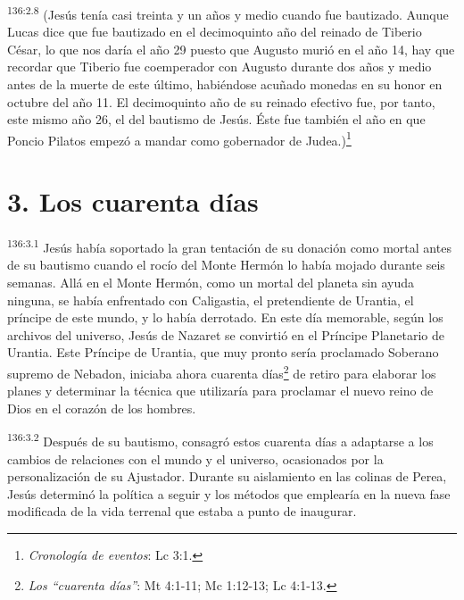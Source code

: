 \par 
\textsuperscript{136:2.8} (Jesús tenía casi treinta y un años y medio cuando fue bautizado. Aunque Lucas dice que fue bautizado en el decimoquinto año del reinado de Tiberio César, lo que nos daría el año 29 puesto que Augusto murió en el año 14, hay que recordar que Tiberio fue coemperador con Augusto durante dos años y medio antes de la muerte de este último, habiéndose acuñado monedas en su honor en octubre del año 11. El decimoquinto año de su reinado efectivo fue, por tanto, este mismo año 26, el del bautismo de Jesús. Éste fue también el año en que Poncio Pilatos empezó a mandar como gobernador de Judea.)\footnote{\textit{Cronología de eventos}: Lc 3:1.}

\section*{3. Los cuarenta días}
\par 
\textsuperscript{136:3.1} Jesús había soportado la gran tentación de su donación como mortal antes de su bautismo cuando el rocío del Monte Hermón lo había mojado durante seis semanas. Allá en el Monte Hermón, como un mortal del planeta sin ayuda ninguna, se había enfrentado con Caligastia, el pretendiente de Urantia, el príncipe de este mundo, y lo había derrotado. En este día memorable, según los archivos del universo, Jesús de Nazaret se convirtió en el Príncipe Planetario de Urantia. Este Príncipe de Urantia, que muy pronto sería proclamado Soberano supremo de Nebadon, iniciaba ahora cuarenta días\footnote{\textit{Los ``cuarenta días''}: Mt 4:1-11; Mc 1:12-13; Lc 4:1-13.} de retiro para elaborar los planes y determinar la técnica que utilizaría para proclamar el nuevo reino de Dios en el corazón de los hombres.

\par 
\textsuperscript{136:3.2} Después de su bautismo, consagró estos cuarenta días a adaptarse a los cambios de relaciones con el mundo y el universo, ocasionados por la personalización de su Ajustador. Durante su aislamiento en las colinas de Perea, Jesús determinó la política a seguir y los métodos que emplearía en la nueva fase modificada de la vida terrenal que estaba a punto de inaugurar.

